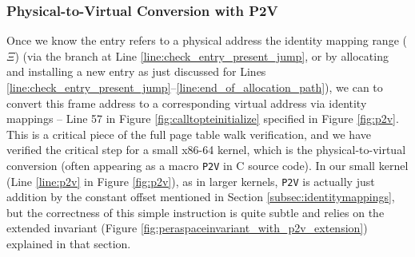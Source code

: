 \subsubsection{Physical-to-Virtual Conversion with \textsf{P2V}}
\label{sec:p2v}
Once we know the entry refers to a physical address the identity mapping range ($\Xi$)
(via the branch at Line \ref{line:check_entry_present_jump}, or  by allocating and installing a new entry
as just discussed for Lines \ref{line:check_entry_present_jump}--\ref{line:end_of_allocation_path}), 
we can %
to convert this frame address to a corresponding virtual address via identity mappings -- Line 57 in Figure \ref{fig:calltopteinitialize} 
specified in Figure \ref{fig:p2v}.
This is a critical piece of the full page table walk verification, and we have verified the critical step for a small x86-64 kernel, 
which is the physical-to-virtual conversion (often appearing as a macro \texttt{P2V} in C source code). 
In our small kernel (Line \ref{line:p2v} in Figure \ref{fig:p2v}), as in larger kernels, \texttt{P2V} is actually just addition by the
constant offset mentioned in Section \ref{subsec:identitymappings}, but the correctness 
of this simple instruction is quite subtle and relies on the extended invariant (Figure \ref{fig:peraspaceinvariant_with_p2v_extension})
explained in that section.

